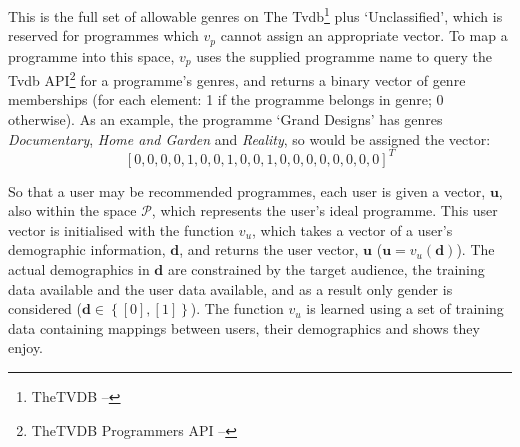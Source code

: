 		This is the full set of allowable genres on The Tvdb\footnote{TheTVDB -- } plus `Unclassified', which is reserved for programmes which $v_p$ cannot assign an appropriate vector. To map a programme into this space, $v_p$ uses the supplied programme name to query the Tvdb API\footnote{TheTVDB Programmers API -- } for a programme's genres, and returns a binary vector of genre memberships (for each element: 1 if the programme belongs in genre; 0 otherwise). As an example, the programme `Grand Designs' has genres \emph{Documentary}, \emph{Home and Garden} and \emph{Reality}, so would be assigned the vector:
		$$
		\left[0,0,0,0,1,0,0,1,0,0,1,0,0,0,0,0,0,0,0\right]^T
		$$

		So that a user may be recommended programmes, each user is given a vector, $\mathbf{u}$, also within the space $\mathcal{P}$, which represents the user's ideal programme. This user vector is initialised with the function $v_u$, which takes a vector of a user's demographic information, $\mathbf{d}$, and returns the user vector, $\mathbf{u}$ ($\mathbf{u} = v_u(\mathbf{d})$). The actual demographics in $\mathbf{d}$ are constrained by the target audience, the training data available and the user data available, and as a result only gender is considered ($\mathbf{d} \in \left\{{ \left[ 0\right] ,\left[ 1\right] }\right\} $). The function $v_u$ is learned using a set of training data containing mappings between users, their demographics and shows they enjoy. 

